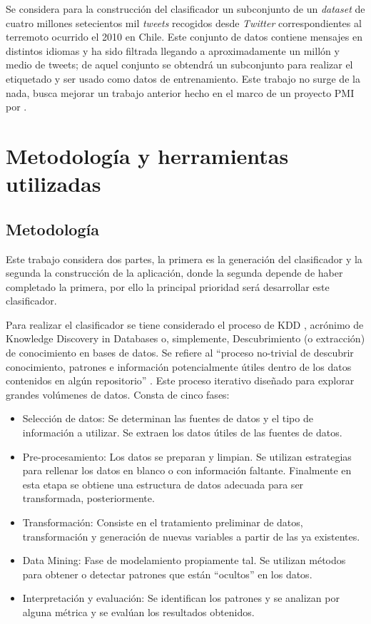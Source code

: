 Se considera para la construcción del clasificador un subconjunto de un \textit{dataset} de cuatro millones setecientos mil \textit{tweets} recogidos desde \textit{Twitter} correspondientes al terremoto ocurrido el 2010 en Chile. Este conjunto de datos contiene mensajes en distintos idiomas y ha sido filtrada llegando a aproximadamente un millón y medio de tweets; de aquel conjunto se obtendrá un subconjunto para realizar el etiquetado y ser usado como datos de entrenamiento. Este trabajo no surge de la nada, busca mejorar un trabajo anterior hecho en el marco de un proyecto PMI por \cite{WladdimiroPMI}.

\section{Metodología y herramientas utilizadas}
\label{intro:metodologia}

\subsection{Metodología}
\label{subsec:metodologiaIntro}

Este trabajo considera dos partes, la primera es la generación del clasificador y la segunda la construcción de la aplicación, donde la segunda depende de haber completado la primera, por ello la principal prioridad será desarrollar este clasificador.

Para realizar el clasificador se tiene considerado el proceso de KDD \cite{KDDFayyad}, acrónimo de Knowledge Discovery in Databases o, simplemente, Descubrimiento (o extracción) de conocimiento en bases de datos. Se refiere al “proceso no-trivial de descubrir conocimiento, patrones e información potencialmente útiles dentro de los datos contenidos en algún repositorio” \cite{KDDDefinicion}. Este proceso iterativo diseñado para explorar grandes volúmenes de datos. Consta de cinco fases:

\begin{itemize}
\item	Selección de datos: Se determinan las fuentes de datos y el tipo de información a utilizar. Se extraen los datos útiles de las fuentes de datos.
\item	Pre-procesamiento: Los datos se preparan y limpian. Se utilizan estrategias para rellenar los datos en blanco o con información faltante. Finalmente en esta etapa se obtiene una estructura de datos adecuada para ser transformada, posteriormente.
\item	Transformación: Consiste en el tratamiento preliminar de datos, transformación y generación de nuevas variables a partir de las ya existentes. 
\item	Data Mining: Fase de modelamiento propiamente tal. Se utilizan métodos para obtener o detectar patrones que están “ocultos” en los datos.
\item	Interpretación y evaluación: Se identifican los patrones y se analizan por alguna métrica y se evalúan los resultados obtenidos.
\end{itemize}


